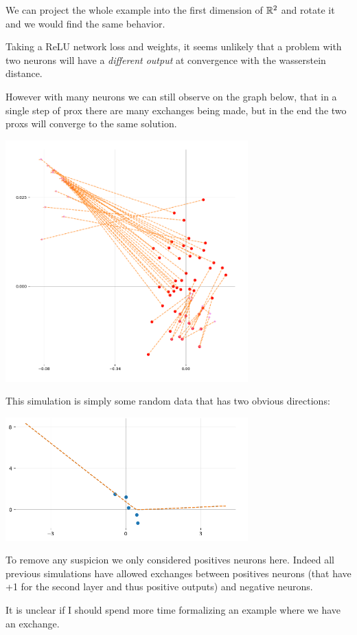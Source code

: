 We can project the whole example into the first dimension of $\mathbb{R}^2$ and rotate it and we would find the same behavior.

Taking a ReLU network loss and weights, it seems unlikely that a problem with two neurons will have a \emph{different output} at convergence with the wasserstein distance.

However with many neurons we can still observe on the graph below, that in a single step of prox there are many exchanges being made, but in the end the two proxs will converge to the same solution.

\includegraphics[width=0.7\textwidth]{imgs/graph_onlypositives.png}

This simulation is simply some random data that has two obvious directions:

\includegraphics[width=0.7\textwidth]{imgs/graph_onlypositives_data.png}

To remove any suspicion we only considered positives neurons here. Indeed all previous simulations have allowed exchanges between positives neurons (that have +1 for the second layer and thus positive outputs) and negative neurons.

It is unclear if I should spend more time formalizing an example where we have an exchange.

